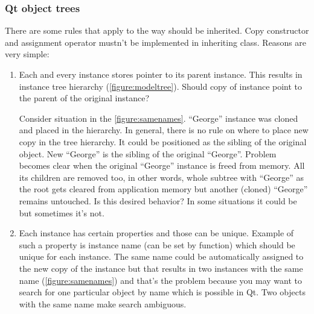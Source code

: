 \subsubsection{Qt object trees}\label{section:model}
There are some rules that apply to the way should be inherited. Copy constructor and assignment operator mustn't be implemented in inheriting class. Reasons are very simple:
\begin{enumerate}
\item Each and every instance stores pointer to its parent instance. This results in instance tree hierarchy (\autoref{figure:modeltree}). Should copy of instance point to the parent of the original instance?

Consider situation in the \autoref{figure:samenames}. \enquote{George} instance was cloned and placed in the hierarchy. In general, there is no rule on where to place new copy in the tree hierarchy. It could be positioned as the sibling of the original object. New \enquote{George} is the sibling of the original \enquote{George}. Problem becomes clear when the original \enquote{George} instance is freed from memory. All its children are removed too, in other words, whole subtree with \enquote{George} as the root gets cleared from application memory but another (cloned) \enquote{George} remains untouched. Is this desired behavior? In some situations it could be but sometimes it's not.

\item Each instance has certain properties and those can be unique. Example of such a property is instance name (can be set by function) which should be unique for each instance. The same name could be automatically assigned to the new copy of the instance but that results in two instances with the same name (\autoref{figure:samenames}) and that's the problem because you may want to search for one particular object by name which is possible in Qt. Two objects with the same name make search ambiguous.
\end{enumerate}

